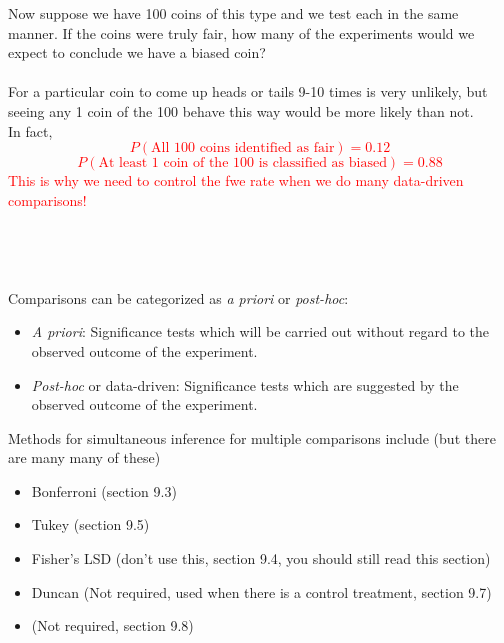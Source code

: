 \newpage
 

Now suppose we have 100 coins of this type and we test each in the same manner.  If the coins were truly fair, how many of the experiments would we expect to conclude we have a biased coin?\\~\\
For a particular coin to come up heads or tails 9-10 times is very unlikely, but seeing any 1 coin of the 100 behave this way would be more likely than not.\\
In fact, %
\textcolor{red}{
$$P(\mbox{All 100 coins identified as fair})=0.12$$
$$P(\mbox{At least 1 coin of the 100 is classified as biased})=0.88$$
This is why we need to control the fwe rate when we do many data-driven comparisons!}\\~\\
\\~\\~\\
\color{black}
Comparisons can be categorized as {\em a priori} or {\em post-hoc}:
\begin{itemize}
\item {\em A priori}: Significance tests which will be carried out without regard to the observed outcome of the experiment.
\item {\em Post-hoc} or data-driven: Significance tests which are suggested by the observed outcome of the experiment.
\end{itemize}

Methods for simultaneous inference for multiple comparisons include (but there are many many of these)
\begin{itemize}
\item Bonferroni (section 9.3)
\item Tukey (section 9.5)
\item Fisher's LSD (don't use this, section 9.4, you should still read this section)
\item Duncan (Not required, used when there is a control treatment, section 9.7)
\item \chef (Not required, section 9.8)
\end{itemize}

